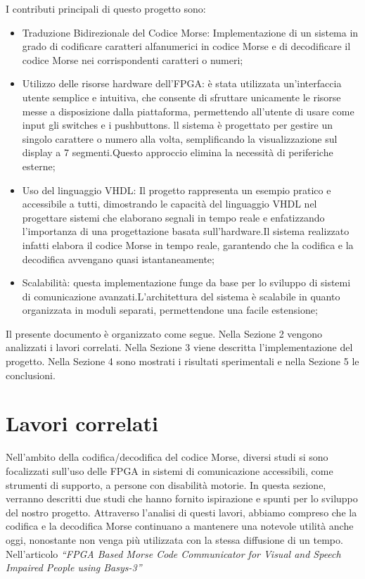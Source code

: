\documentclass[journal,twoside,web]{ieeecolor}
\begin{document}
I contributi principali di questo progetto sono:
\begin{itemize}
    \item Traduzione Bidirezionale del Codice Morse: Implementazione di un sistema in grado di codificare caratteri alfanumerici in codice Morse e di decodificare il codice Morse nei corrispondenti caratteri o numeri; 
    \item Utilizzo delle risorse hardware dell’FPGA: è stata utilizzata un’interfaccia utente semplice e intuitiva, che consente di sfruttare unicamente le risorse messe a disposizione dalla piattaforma, permettendo all’utente di usare come input gli switches e i pushbuttons. ll sistema è progettato per gestire un singolo carattere o numero alla volta, semplificando la visualizzazione sul display a 7 segmenti.Questo approccio elimina la necessità di periferiche esterne;
    \item Uso del linguaggio VHDL: Il progetto rappresenta un esempio pratico e accessibile a tutti, dimostrando le capacità del linguaggio VHDL nel progettare sistemi che elaborano segnali in tempo reale e enfatizzando l'importanza di una progettazione basata sull’hardware.Il sistema realizzato infatti elabora il codice Morse in tempo reale, garantendo che la codifica e la decodifica avvengano quasi istantaneamente;
    \item Scalabilità: questa implementazione funge da base per lo sviluppo di sistemi di comunicazione avanzati.L’architettura del sistema è scalabile in quanto organizzata in moduli separati, permettendone una facile estensione;
\end{itemize}

Il presente documento è organizzato come segue. Nella Sezione 2 vengono analizzati i lavori correlati. Nella Sezione 3 viene descritta l’implementazione del progetto. Nella Sezione 4 sono mostrati i risultati sperimentali e nella Sezione 5 le conclusioni.





\section{Lavori correlati}
Nell’ambito della codifica/decodifica del codice Morse, diversi studi si sono focalizzati sull'uso delle FPGA in sistemi di comunicazione accessibili, come strumenti di supporto, a persone con disabilità motorie. In questa sezione, verranno descritti due  studi che hanno fornito ispirazione e spunti per lo sviluppo del nostro progetto. Attraverso l'analisi di questi lavori, abbiamo compreso che la codifica e la decodifica Morse continuano a mantenere una notevole utilità anche oggi, nonostante non venga più utilizzata con la stessa diffusione di un tempo.
Nell’articolo  \textit{“FPGA Based Morse Code Communicator for Visual and Speech Impaired People using Basys-3”} 
\end{document}
